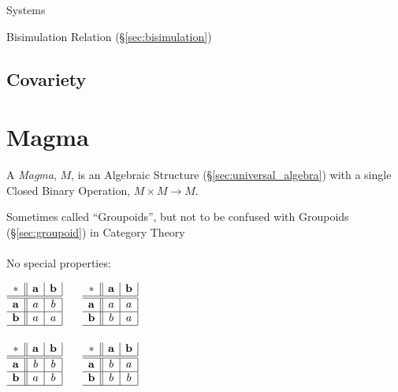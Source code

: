 \cite{rutten00}

Systems

Bisimulation Relation (\S\ref{sec:bisimulation})



\subsection{Covariety}\label{sec:covariety}



\section{Magma}\label{sec:magma}

A \emph{Magma}, $M$, is an Algebraic Structure
(\S\ref{sec:universal_algebra}) with a single Closed Binary Operation,
$M \times M \rightarrow M$.

\fist Sometimes called ``Groupoids'', but not to be confused with Groupoids
(\S\ref{sec:groupoid}) in Category Theory
\\ \\
No special properties:

$\begin{array}{c||c|c|}
  * & \mathbf{a} & \mathbf{b} \\ \hline \hline
  \mathbf{a} & a & b \\ \hline
  \mathbf{b} & a & a \\ \hline
\end{array}$ $\quad$ $\begin{array}{c||c|c|}
  * & \mathbf{a} & \mathbf{b} \\ \hline \hline
  \mathbf{a} & a & a \\ \hline
  \mathbf{b} & b & a \\ \hline
\end{array}$ \\ \hfill \\

$\begin{array}{c||c|c|}
  * & \mathbf{a} & \mathbf{b} \\ \hline \hline
  \mathbf{a} & b & b \\ \hline
  \mathbf{b} & a & b \\ \hline
\end{array}$ $\quad$ $\begin{array}{c||c|c|}
  * & \mathbf{a} & \mathbf{b} \\ \hline \hline
  \mathbf{a} & b & a \\ \hline
  \mathbf{b} & b & b \\ \hline
\end{array}$ \\ \hfill \\

